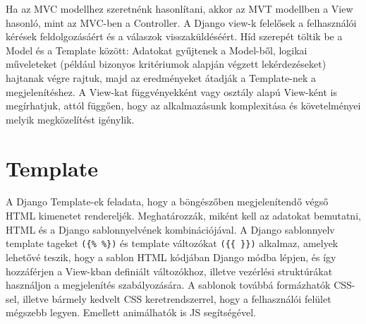 Ha az MVC modellhez szeretnénk hasonlítani, akkor az MVT modellben a View hasonló, mint az MVC-ben a Controller.
A Django view-k felelősek a felhasználói kérések feldolgozásáért és a válaszok visszaküldéséért. Híd szerepét töltik be a Model és a Template között: Adatokat gyűjtenek a Model-ből, logikai műveleteket (például bizonyos kritériumok alapján végzett lekérdezéseket) hajtanak végre rajtuk, majd az eredményeket átadják a Template-nek a megjelenítéshez.
A View-kat függvényekként vagy osztály alapú View-ként is megírhatjuk, attól függően, hogy az alkalmazásunk komplexitása és követelményei melyik megközelítést igénylik.\cite{MVT_Design}

\section{Template}

A Django Template-ek feladata, hogy a böngészőben megjelenítendő végső HTML kimenetet rendereljék. Meghatározzák, miként kell az adatokat bemutatni, HTML és a Django sablonnyelvének kombinációjával.
A Django sablonnyelv template tageket \verb|({% %})| és template változókat \verb|({{ }})| alkalmaz, amelyek lehetővé teszik, hogy a sablon HTML kódjában Django módba lépjen, és így hozzáférjen a View-kban definiált változókhoz, illetve vezérlési struktúrákat használjon a megjelenítés szabályozására.
A sablonok továbbá formázhatók CSS-sel, illetve bármely kedvelt CSS keretrendszerrel, hogy a felhasználói felület mégszebb legyen. Emellett animálhatók is JS segítségével.\cite{MVT_Design}




